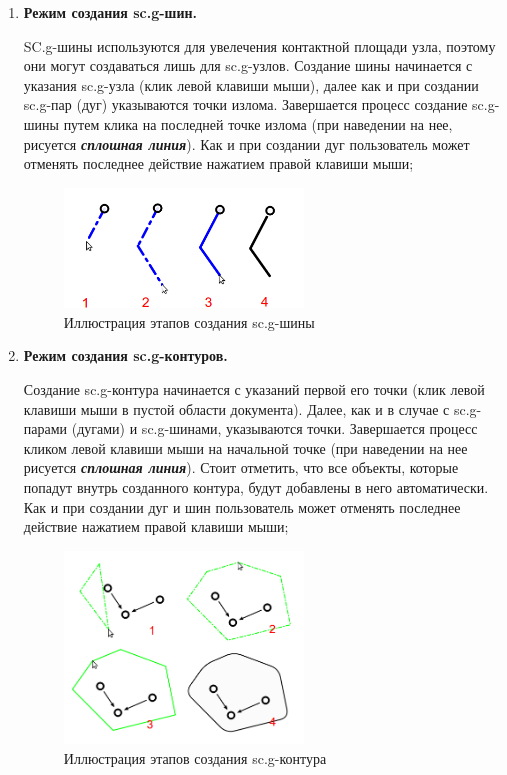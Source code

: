 \begin{enumerate}
 \item \textbf{Режим создания sc.g-шин.}
 
 SC.g-шины используются для увелечения контактной площади узла, поэтому они могут создаваться лишь для sc.g-узлов. 
 Создание шины начинается с указания sc.g-узла (клик левой клавиши мыши), далее как и при создании sc.g-пар (дуг) указываются точки излома. 
 Завершается процесс создание sc.g-шины путем клика на последней точке излома (при наведении на нее, рисуется {\bf\it сплошная линия}).
 Как и при создании дуг пользователь может отменять последнее действие нажатием правой клавиши мыши;
 \begin{figure}[H]
    \begin{center}
	\includegraphics[width=0.6\textwidth]{../images/scg/scg-create-bus.png}
	\caption{Иллюстрация этапов создания sc.g-шины}
	\label{scg_illustration_create_bus}
    \end{center}
 \end{figure}

 \item \textbf{Режим создания sc.g-контуров.}
 
 Создание sc.g-контура начинается с указаний первой его точки (клик левой клавиши мыши в пустой области документа). 
 Далее, как и в случае с sc.g-парами (дугами) и sc.g-шинами, указываются точки.
 Завершается процесс кликом левой клавиши мыши на начальной точке (при наведении на нее рисуется {\bf\it сплошная линия}).
 Стоит отметить, что все объекты, которые попадут внутрь созданного контура, будут добавлены в него автоматически.
 Как и при создании дуг и шин пользователь может отменять последнее действие нажатием правой клавиши мыши;
 \begin{figure}[H]
    \begin{center}
	\includegraphics[width=0.6\textwidth]{../images/scg/scg-create-contour.png}
	\caption{Иллюстрация этапов создания sc.g-контура}
	\label{scg_illustration_create_contour}
    \end{center}
 \end{figure}

\end{enumerate}

